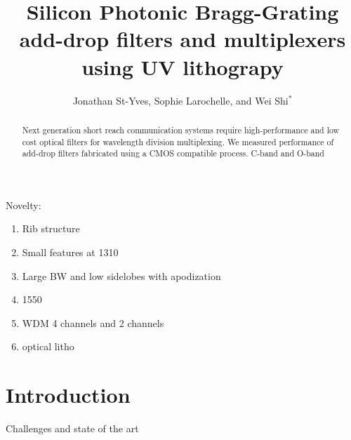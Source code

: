 \documentclass[letterpaper,10pt]{article}
\begin{document}
\title{Silicon Photonic Bragg-Grating add-drop filters and multiplexers using UV lithograpy}



\author{Jonathan St-Yves, Sophie Larochelle, and Wei Shi$^*$}
\address{Centre d'optique, photonique et laser (COPL) and Département de génie électrique, Université Laval, 2375 rue de la Terrasse, Québec (Québec), Canada, G1V 0A6}




\begin{abstract}
Next generation short reach communication systems require high-performance and low cost optical filters for wavelength division multiplexing. We measured performance of add-drop filters fabricated using a CMOS compatible process. C-band and O-band
\end{abstract}



\maketitle


Novelty:
\begin{enumerate}
	\item Rib structure
	\item Small features at 1310
	\item Large BW and low sidelobes with apodization
	\item 1550
	\item WDM 4 channels and 2 channels
	\item optical litho
\end{enumerate}

\section{Introduction}
Challenges and state of the art
\end{document}

